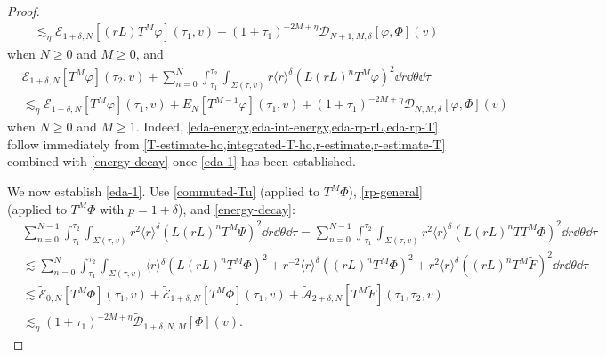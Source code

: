\documentclass[10pt, reqno]{amsart}
\begin{document}
\begin{proof}
\begin{equation}
\begin{split}
&\lesssim_\eta{}  \mathcal{E}_{1+\delta{},N}[(rL)T^M\varphi{}](\tau{}_1,v) + (1+\tau{}_1)^{-2M+\eta{}}\mathcal{D}_{N+1,M,\delta{}}[\varphi{},\Phi{}](v)
\end{split}
\end{equation}
when \(N\ge 0\) and \(M\ge 0\), and
\begin{equation}\label{eda-rp-T}
\begin{split}
&\mathcal{E}_{1+\delta{},N}[T^M\varphi{}](\tau{}_2,v) + \sum_{n=0}^N\int_{\tau{}_1}^{\tau{}_2} \int _{\Sigma{}(\tau{},v)} r\langle{}r\rangle^\delta{}(L(rL)^nT^M\varphi{})^2\dd{}r\dd{}\theta{}\dd{}\tau{}\\
&\lesssim_\eta{}  \mathcal{E}_{1+\delta{},N}[T^M\varphi{}](\tau{}_1,v) +  E_N[T^{M-1}\varphi{}](\tau{}_1,v) + (1+\tau{}_1)^{-2M+\eta{}}\mathcal{D}_{N,M,\delta{}}[\varphi{},\Phi{}](v)
\end{split}
\end{equation}
when \(N\ge 0\) and \(M\ge 1\).
Indeed, \cref{eda-energy,eda-int-energy,eda-rp-rL,eda-rp-T} follow immediately from
\cref{T-estimate-ho,integrated-T-ho,r-estimate,r-estimate-T} combined with
\cref{energy-decay} once \cref{eda-1} has been established.

We now establish \cref{eda-1}. Use \cref{commuted-Tu} (applied to \(T^M\Phi{}\)),
\cref{rp-general} (applied to \(T^M\Phi{}\) with \(p = 1 + \delta{}\)), and \cref{energy-decay}:
\begin{equation}
\begin{split}
&\sum_{n=0}^{N-1}\int_{\tau{}_1}^{\tau{}_2} \int _{\Sigma{}(\tau{},v)}r^{2}\langle{}r\rangle^\delta{}(L(rL)^nT^M\Psi{})^2\dd{}r\dd{}\theta{}\dd{}\tau{} = \sum_{n=0}^{N-1}\int_{\tau{}_1}^{\tau{}_2} \int _{\Sigma{}(\tau{},v)}r^{2}\langle{}r\rangle^\delta{}(L(rL)^nTT^M\Phi{})^2\dd{}r\dd{}\theta{}\dd{}\tau{} \\
&\lesssim \sum_{n=0}^{N}\int_{\tau{}_1}^{\tau{}_2} \int _{\Sigma{}(\tau{},v)} \langle{}r\rangle{}^{\delta{}}(L(rL)^nT^{M}\Phi{})^2 + r^{-2}\langle{}r\rangle^\delta{}((rL)^nT^M\Phi{})^2 + r^2\langle{}r\rangle^\delta{}((rL)^nT^M\tilde{F})^2\dd{}r\dd{}\theta{}\dd{}\tau{} \\
&\lesssim \tilde{\mathcal{E}}_{0,N}[T^M\Phi{}](\tau{}_1,v) + \tilde{\mathcal{E}}_{1+\delta{},N}[T^M\Phi{}](\tau{}_1,v) + \tilde{\mathcal{A}}_{2+\delta{},N}[T^M\tilde{F}](\tau{}_1,\tau{}_2,v) \\
&\lesssim_\eta{} (1+\tau{}_1)^{-2M+\eta{}}\tilde{\mathcal{D}}_{1+\delta{},N,M}[\Phi{}](v).
\end{split}
\end{equation}


\end{proof}
\end{document}
